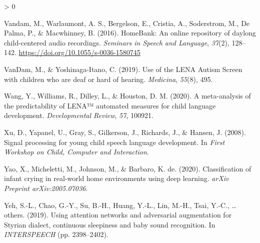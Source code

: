 \documentclass[
  english,
  ,man]{apa6}
\newlength{\cslhangindent}
\newenvironment{CSLReferences}[2] %
 {%
  \setlength{\parindent}{0pt}
  \ifodd #1 \everypar{\setlength{\hangindent}{\cslhangindent}}\ignorespaces\fi
  \ifnum #2 > 0
  \setlength{\parskip}{#2\baselineskip}
  \fi
 }%
 {}
\begin{document}
\begin{CSLReferences}{1}{0}
\leavevmode\hypertarget{ref-vandam2016homebank}{}%
Vandam, M., Warlaumont, A. S., Bergelson, E., Cristia, A., Soderstrom, M., De Palma, P., \& Macwhinney, B. (2016). HomeBank: An online repository of daylong child-centered audio recordings. \emph{Seminars in Speech and Language}, \emph{37}(2), 128--142. \url{https://doi.org/10.1055/s-0036-1580745}

\leavevmode\hypertarget{ref-vandam2019use}{}%
VanDam, M., \& Yoshinaga-Itano, C. (2019). Use of the {LENA Autism Screen} with children who are deaf or hard of hearing. \emph{Medicina}, \emph{55}(8), 495.

\leavevmode\hypertarget{ref-wang2020meta}{}%
Wang, Y., Williams, R., Dilley, L., \& Houston, D. M. (2020). A meta-analysis of the predictability of {LENA}™ automated measures for child language development. \emph{Developmental Review}, \emph{57}, 100921.

\leavevmode\hypertarget{ref-xu2008signal}{}%
Xu, D., Yapanel, U., Gray, S., Gilkerson, J., Richards, J., \& Hansen, J. (2008). Signal processing for young child speech language development. In \emph{First {Workshop on Child, Computer and Interaction}}.

\leavevmode\hypertarget{ref-yao2020classification}{}%
Yao, X., Micheletti, M., Johnson, M., \& Barbaro, K. de. (2020). Classification of infant crying in real-world home environments using deep learning. \emph{arXiv Preprint arXiv:2005.07036}.

\leavevmode\hypertarget{ref-yeh2019using}{}%
Yeh, S.-L., Chao, G.-Y., Su, B.-H., Huang, Y.-L., Lin, M.-H., Tsai, Y.-C., \ldots{} others. (2019). Using attention networks and adversarial augmentation for {S}tyrian dialect, continuous sleepiness and baby sound recognition. In \emph{INTERSPEECH} (pp. 2398--2402).

\end{CSLReferences}


\clearpage
\renewcommand{\listfigurename}{Figure captions}
\end{document}
